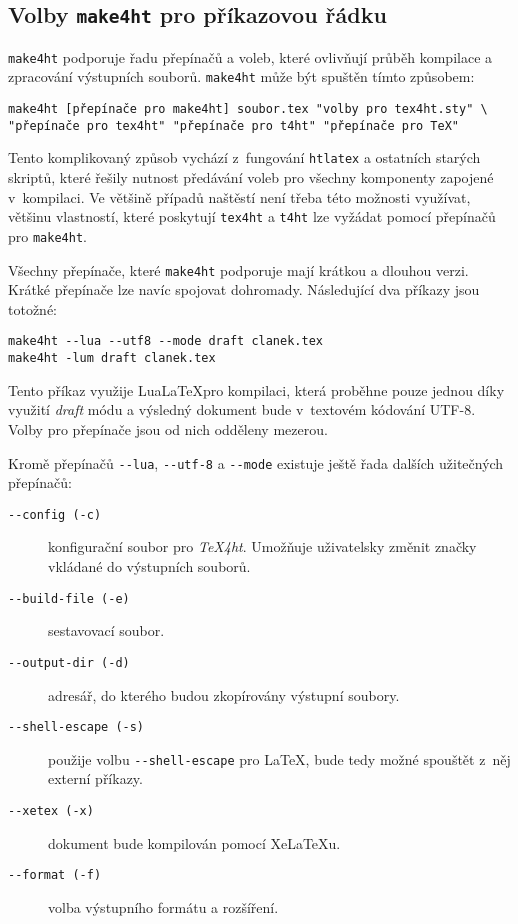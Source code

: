 \documentclass{csbulletin}
\newcommand\nazev[1]{\textit{#1}}
\newcommand\prikaz[1]{\texttt{#1}}
\newcommand\prepinac[1]{\texttt{-\/-#1}}
\begin{document}
\subsection{Volby \prikaz{make4ht} pro příkazovou řádku}

\prikaz{make4ht} podporuje řadu přepínačů a voleb, které ovlivňují průběh kompilace a zpracování výstupních souborů. \prikaz{make4ht} může být spuštěn tímto způsobem:

\begin{verbatim}
make4ht [přepínače pro make4ht] soubor.tex "volby pro tex4ht.sty" \
"přepínače pro tex4ht" "přepínače pro t4ht" "přepínače pro TeX"
\end{verbatim}

Tento komplikovaný způsob vychází z~fungování \prikaz{htlatex} a ostatních
starých skriptů, které řešily nutnost předávání voleb pro všechny komponenty
zapojené v~kompilaci. Ve většině případů naštěstí není třeba této možnosti
využívat, většinu vlastností, které poskytují \prikaz{tex4ht} a \prikaz{t4ht}
lze vyžádat pomocí přepínačů pro \prikaz{make4ht}.

Všechny přepínače, které \prikaz{make4ht} podporuje mají krátkou a dlouhou verzi. Krátké přepínače lze navíc spojovat dohromady. Následující dva příkazy jsou totožné:

\begin{verbatim}
make4ht --lua --utf8 --mode draft clanek.tex
make4ht -lum draft clanek.tex
\end{verbatim}

Tento příkaz využije Lua\LaTeX pro kompilaci, která proběhne pouze jednou díky
využití \nazev{draft} módu a výsledný dokument bude v~textovém kódování UTF-8.
Volby pro přepínače jsou od nich odděleny mezerou.

Kromě přepínačů \prepinac{lua}, \prepinac{utf-8} a \prepinac{mode} existuje ještě řada dalších užitečných přepínačů:

\begin{description}
  \item[\prepinac{config (-c)}] konfigurační soubor pro \nazev{TeX4ht}. Umožňuje uživatelsky změnit značky vkládané do výstupních souborů.
  \item[\prepinac{build-file (-e)}] sestavovací soubor.
  \item[\prepinac{output-dir (-d)}] adresář, do kterého budou zkopírovány výstupní soubory.
  \item[\prepinac{shell-escape (-s)}] použije volbu \verb|--shell-escape| pro \LaTeX, bude tedy možné spouštět z~něj externí příkazy.
  \item[\prepinac{xetex (-x)}] dokument bude kompilován pomocí Xe\LaTeX u.
  \item[\prepinac{format (-f)}] volba výstupního formátu a rozšíření.
\end{description}
\end{document}
